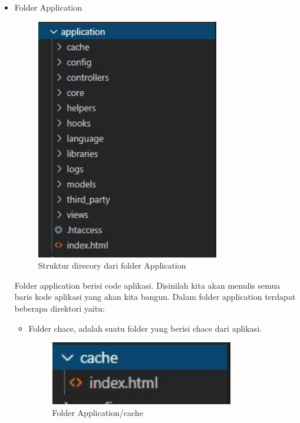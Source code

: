 \begin{itemize}
	\begin{itemize}
		\item Folder Application
		\hfill\\
		\begin{figure}[H]
			\includegraphics[width=8cm]{figures/instalasi/ci5.jpg}
			\centering
		\caption{Struktur direcory dari folder Application}
	\end{figure}
		Folder application berisi code aplikasi. Disinilah kita akan menulis semua baris kode aplikasi yang akan kita bangun. Dalam folder application terdapat beberapa direktori yaitu:
		\begin{itemize}
			\item Folder chace, adalah suatu folder yang berisi chace dari aplikasi.
			\begin{figure}[H]
				\includegraphics[width=8cm]{figures/instalasi/ci6.jpg}
				\centering
				\caption{Folder Application/cache}
			\end{figure}
			

\end{itemize}
\end{itemize}
\end{itemize}
